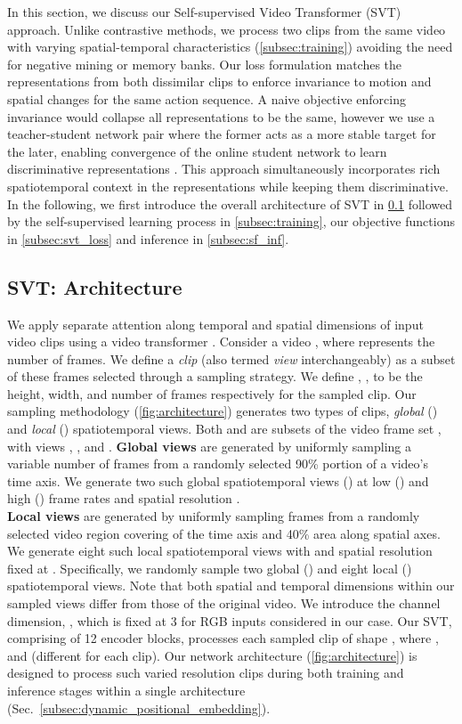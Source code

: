 \documentclass[10pt,twocolumn,letterpaper]{article}
\begin{document}
In this section, we discuss our Self-supervised Video Transformer (SVT) approach. 
Unlike contrastive methods, we process two clips from the same video with varying spatial-temporal characteristics (\cref{subsec:training}) avoiding the need for negative mining or memory banks. 
Our loss formulation matches the representations from both dissimilar clips to enforce invariance to motion and spatial changes for the same action sequence. 
A naive objective enforcing invariance would collapse all representations to be the same, however we use a teacher-student network pair where the former acts as a more stable target for the later, enabling convergence of the online student network to learn discriminative representations \cite{grill2020bootstrap}.
This approach simultaneously incorporates rich spatiotemporal context in the representations while keeping them discriminative. In the following, we first introduce the overall architecture of SVT in \cref{subsec:arch} followed by the self-supervised learning process in \cref{subsec:training}, our objective functions in \cref{subsec:svt_loss} and inference in \cref{subsec:sf_inf}. 


\subsection{SVT: Architecture}\label{subsec:arch}
We apply separate attention along temporal and spatial dimensions of input video clips using a video transformer \cite{gberta_2021_ICML}. 
Consider a video , where  represents the number of frames. 
We define a \textit{clip} (also termed \textit{view} interchangeably) as a subset of these  frames selected through a sampling strategy. 
We define , ,  to be the height, width, and number of frames respectively for the sampled clip. Our sampling methodology (\cref{fig:architecture}) generates two types of clips, \textit{global} () and \textit{local} () spatiotemporal views. Both  and  are subsets of the video frame set , with views , , and . 
\noindent \textbf{Global views} are generated by uniformly sampling a variable number of frames from a randomly selected 90\% portion of a video's time axis. We generate two such global spatiotemporal views () at low () and high () frame rates and spatial resolution . \\
\noindent \textbf{Local views} are generated by uniformly sampling frames from a randomly selected video region covering  of the time axis and  40\% area along spatial axes. We generate eight such local spatiotemporal views with  and spatial resolution fixed at . 
Specifically, we randomly sample two global () and eight local () spatiotemporal views. Note that both spatial and temporal dimensions within our sampled views differ from those of the original video.
We introduce the channel dimension, , which is fixed at 3 for RGB inputs considered in our case. Our SVT, comprising of 12 encoder blocks, processes each sampled clip of shape , where ,  and  (different for each clip).
Our network architecture (\cref{fig:architecture}) is designed to process such varied resolution clips during both training and inference stages within a single architecture (Sec.~\ref{subsec:dynamic_positional_embedding}). 
\end{document}
